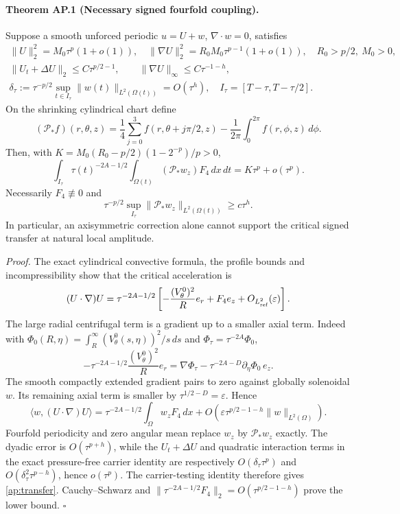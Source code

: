 \paragraph{Theorem AP.1 (Necessary signed fourfold coupling).}
Suppose a smooth unforced periodic $u=U+w$, $\nabla\cdot w=0$, satisfies
\[
\begin{gathered}
\|U\|_2^2=M_0\tau^p(1+o(1)),\quad
\|\nabla U\|_2^2=R_0M_0\tau^{p-1}(1+o(1)),
\quad R_0>p/2,\ M_0>0,\\
\|U_t+\Delta U\|_2\le C\tau^{p/2-1},\qquad
\|\nabla U\|_\infty\le C\tau^{-1-h},\\
\delta_\tau:=\tau^{-p/2}
\sup_{t\in I_\tau}\|w(t)\|_{L^2(\Omega(t))}=O(\tau^h),\quad
I_\tau=[T-\tau,T-\tau/2].
\end{gathered}
\]
On the shrinking cylindrical chart define
\[
(\mathcal P_*f)(r,\theta,z)=\frac14\sum_{j=0}^3
f(r,\theta+j\pi/2,z)-\frac1{2\pi}\int_0^{2\pi}f(r,\phi,z)\,d\phi.
\]
Then, with $K=M_0(R_0-p/2)(1-2^{-p})/p>0$,
\begin{equation}\label{ap:transfer}
\boxed{\int_{I_\tau}\!\tau(t)^{-2A-1/2}
\int_{\Omega(t)}(\mathcal P_*w_z)F_4\,dx\,dt
=K\tau^p+o(\tau^p).}
\end{equation}
Necessarily $F_4\not\equiv0$ and
\[
\boxed{\tau^{-p/2}\sup_{I_\tau}
\|\mathcal P_*w_z\|_{L^2(\Omega(t))}\ge c\tau^h.}
\]
In particular, an axisymmetric correction alone cannot support the critical signed transfer at natural local amplitude.

\emph{Proof.} The exact cylindrical convective formula, the profile bounds and incompressibility show that the critical acceleration is
\[
(U\cdot\nabla)U
=\tau^{-2A-1/2}\left[-\frac{(V_\theta^0)^2}{R}e_r
+F_4e_z+O_{L^2_{\rm ref}}(\varepsilon)\right].
\]
The large radial centrifugal term is a gradient up to a smaller axial term. Indeed with
$\Phi_0(R,\eta)=\int_R^\infty(V_\theta^0(s,\eta))^2/s\,ds$ and
$\Phi_\tau=\tau^{-2A}\Phi_0$,
\[
-\tau^{-2A-1/2}\frac{(V_\theta^0)^2}{R}e_r
=\nabla\Phi_\tau-\tau^{-2A-D}\partial_\eta\Phi_0\,e_z.
\]
The smooth compactly extended gradient pairs to zero against globally solenoidal $w$. Its remaining axial term is smaller by $\tau^{1/2-D}=\varepsilon$. Hence
\[
\langle w,(U\cdot\nabla)U\rangle=
\tau^{-2A-1/2}\int_\Omega w_zF_4\,dx+
O\left(\varepsilon\tau^{p/2-1-h}\|w\|_{L^2(\Omega)}\right).
\]
Fourfold periodicity and zero angular mean replace $w_z$ by $\mathcal P_*w_z$ exactly. The dyadic error is $O(\tau^{p+h})$, while the $U_t+\Delta U$ and quadratic interaction terms in the exact pressure-free carrier identity are respectively $O(\delta_\tau\tau^p)$ and $O(\delta_\tau^2\tau^{p-h})$, hence $o(\tau^p)$. The carrier-testing identity therefore gives \eqref{ap:transfer}. Cauchy--Schwarz and
$\|\tau^{-2A-1/2}F_4\|_2=O(\tau^{p/2-1-h})$ prove the lower bound. \hfill$\square$

